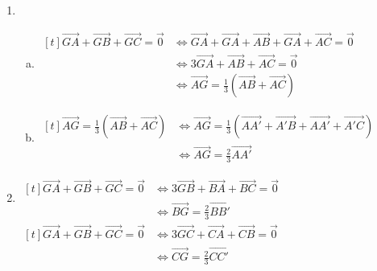 \documentclass[12pt, a4paper]{article}
\begin{document}
\begin{Exercise}[number={149}]
    \begin{enumerate}[1)]
        \item	\begin{enumerate}[a)]
                    \item	$\begin{aligned}[t]
                                \overrightarrow{GA}+\overrightarrow{GB}+\overrightarrow{GC}=\overrightarrow{0}&\iff\overrightarrow{GA}+\overrightarrow{GA}+\overrightarrow{AB}+\overrightarrow{GA}+\overrightarrow{AC}=\overrightarrow{0} &\\
                                &\iff 3\overrightarrow{GA}+\overrightarrow{AB}+\overrightarrow{AC}=\overrightarrow{0} &\\
                                &\iff\overrightarrow{AG}=\tfrac{1}{3}\left(\overrightarrow{AB}+\overrightarrow{AC}\right)
                            \end{aligned}$
                    \item   $\begin{aligned}[t]
                                \overrightarrow{AG}=\tfrac{1}{3}\left(\overrightarrow{AB}+\overrightarrow{AC}\right)&\iff\overrightarrow{AG}=\tfrac{1}{3}\left(\overrightarrow{AA'}+\overrightarrow{A'B}+\overrightarrow{AA'}+\overrightarrow{A'C}\right) &\\
                                &\iff\overrightarrow{AG}=\tfrac{2}{3}\overrightarrow{AA'}
                            \end{aligned}$
                \end{enumerate} \bigbreak
        \item   $\begin{aligned}[t]
                    \overrightarrow{GA}+\overrightarrow{GB}+\overrightarrow{GC}=\overrightarrow{0}&\iff 3\overrightarrow{GB}+\overrightarrow{BA}+\overrightarrow{BC}=\overrightarrow{0} &\\
                    &\iff\overrightarrow{BG}=\tfrac{2}{3}\overrightarrow{BB'}
                \end{aligned}$ \medbreak
                $\begin{aligned}[t]
                    \overrightarrow{GA}+\overrightarrow{GB}+\overrightarrow{GC}=\overrightarrow{0}&\iff 3\overrightarrow{GC}+\overrightarrow{CA}+\overrightarrow{CB}=\overrightarrow{0} &\\
                    &\iff\overrightarrow{CG}=\tfrac{2}{3}\overrightarrow{CC'}
                \end{aligned}$ \bigbreak

\end{enumerate}
\end{Exercise}
\end{document}
